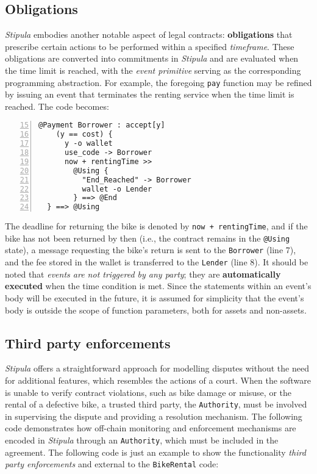 \subsection{Obligations}

\textit{Stipula} embodies another notable aspect of legal contracts: \textbf{obligations} that prescribe 
certain actions to be performed within a specified \textit{timeframe}. These obligations are converted into 
commitments in \textit{Stipula} and are evaluated when the time limit is reached, with the 
\textit{event primitive} serving as the corresponding programming abstraction. For example, the foregoing 
\verb|pay| function may be refined by issuing an event that terminates the renting service when the time 
limit is reached. The code becomes:

\begin{Verbatim}[numbers=left,xleftmargin=1cm,firstnumber=15,breaklines=true,breakanywhere=true,tabsize=2]
  @Payment Borrower : accept[y] 
    (y == cost) {
      y -o wallet
      use_code -> Borrower
      now + rentingTime >>
        @Using {
          "End_Reached" -> Borrower 
          wallet -o Lender
        } ==> @End 
  } ==> @Using
\end{Verbatim}

The deadline for returning the bike is denoted by \verb|now + rentingTime|, and if the bike has not been 
returned by then (i.e., the contract remains in the \verb|@Using| state), a message requesting the bike's 
return is sent to the \verb|Borrower| (line 7), and the fee stored in the wallet is transferred to the 
\verb|Lender| (line 8). It should be noted that \textit{events are not triggered by any party}; they are 
\textbf{automatically executed} when the time condition is met. Since the statements within an event's body 
will be executed in the future, it is assumed for simplicity that the event's body is outside the scope of 
function parameters, both for assets and non-assets. 

\subsection{Third party enforcements}

\textit{Stipula} offers a straightforward approach for modelling disputes without the need for additional 
features, which resembles the actions of a court. When the software is unable to verify contract 
violations, such as bike damage or misuse, or the rental of a defective bike, a trusted third party, the 
\verb|Authority|, must be involved in supervising the dispute and providing a resolution mechanism. The 
following code demonstrates how off-chain monitoring and enforcement mechanisms are encoded in 
\textit{Stipula} through an \verb|Authority|, which must be included in the agreement. The following code 
is just an example to show the functionality \textit{third party enforcements} and external to the 
\verb|BikeRental| code: 

